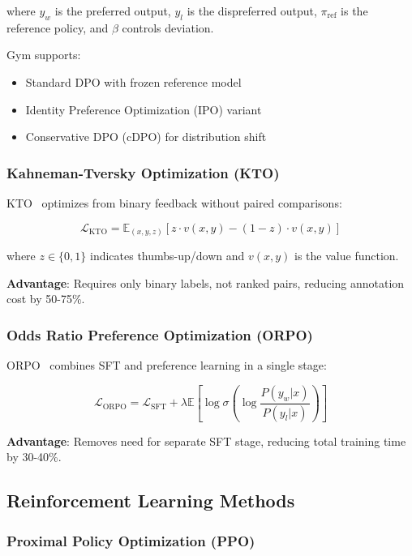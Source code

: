 \documentclass[11pt,letterpaper]{article}
\begin{document}
where $y_w$ is the preferred output, $y_l$ is the dispreferred output, $\pi_{\text{ref}}$ is the reference policy, and $\beta$ controls deviation.

Gym supports:
\begin{itemize}
\item Standard DPO with frozen reference model
\item Identity Preference Optimization (IPO) variant
\item Conservative DPO (cDPO) for distribution shift
\end{itemize}

\subsubsection{Kahneman-Tversky Optimization (KTO)}

KTO~\citep{ethayarajh2024kto} optimizes from binary feedback without paired comparisons:

\begin{equation}
\mathcal{L}_{\text{KTO}} = \mathbb{E}_{(x,y,z)} \left[ z \cdot v(x,y) - (1-z) \cdot v(x,y) \right]
\end{equation}

where $z \in \{0, 1\}$ indicates thumbs-up/down and $v(x,y)$ is the value function.

\textbf{Advantage}: Requires only binary labels, not ranked pairs, reducing annotation cost by 50-75\%.

\subsubsection{Odds Ratio Preference Optimization (ORPO)}

ORPO~\citep{hong2024orpo} combines SFT and preference learning in a single stage:

\begin{equation}
\mathcal{L}_{\text{ORPO}} = \mathcal{L}_{\text{SFT}} + \lambda \mathbb{E} \left[ \log \sigma \left( \log \frac{P(y_w|x)}{P(y_l|x)} \right) \right]
\end{equation}

\textbf{Advantage}: Removes need for separate SFT stage, reducing total training time by 30-40\%.

\subsection{Reinforcement Learning Methods}

\subsubsection{Proximal Policy Optimization (PPO)}
\end{document}
